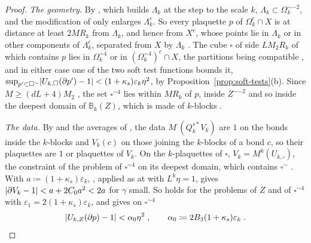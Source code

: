 \documentclass[11pt]{preprint}
\DeclarePairedDelimiter{\abs}{\lvert}{\rvert}
\numberwithin{equation}{section}
\theoremstyle{definition}
\theoremstyle{remark}
\theoremstyle{plain}
\begin{document}
\begin{proof}
\emph{The geometry.} By \cite[(3.20), p.~269]{BalabanCRE}, which builds $\Lambda_k$ at the step to the scale $k$, $\Lambda_k \subset \Omega_k^{\sim-2}$, and the modification of \cite[p.~269]{BalabanCRE} only enlarges $\Lambda_k^c$. So every plaquette $p$ of $\Omega_k^c \cap X$ is at distance at least $2MR_k$ from $\Lambda_k$, and hence from $X^c$, whose points lie in $\Lambda_k$ or in other components of $\Lambda_k^c$, separated from $X$ by $\Lambda_k$ \cite[p.~264]{BalabanCRE}. The cube $\square$ of side $LM_2R_k$ of \cite[(2.17)]{BalabanCRE} which contains $p$ lies in $\Omega_k^{\sim4}$ or in $(\Omega_k^{\sim4})^c \cap X$, the partitions being compatible \cite[p.~245]{BalabanCRE}, and in either case one of the two soft test functions bounds it, $\sup_{p' \subset \square^\sim}\abs{U_{k,\square}(\partial p') - 1} < (1 + \kappa_s)\varepsilon_k\eta^2$, by Proposition~\ref{prop:soft-tests}(b). Since $M \geq (dL + 4)M_2$ \cite[p.~245]{BalabanCRE}, the set $\square^{\sim4}$ lies within $MR_k$ of $p$, inside $Z^{\sim-2}$ and so inside the deepest domain of $\mathbb B_k(Z)$, which is made of $k$-blocks \cite[p.~256]{BalabanCRE}.

\emph{The data.} By \cite[(1.3)]{BalabanCRE} and the averages of \cite[(0.4), p.~253]{BalabanRG1}, the data $M^\cdot(Q_k^{s*}V_k)$ are $1$ on the bonds inside the $k$-blocks and $V_k(c)$ on those joining the $k$-blocks of a bond $c$, so their plaquettes are $1$ or plaquettes of $V_k$. On the $k$-plaquettes of $\square$, $V_k = M^k(U_{k,\square})$, the constraint of the problem of $\square^{\sim4}$ on its deepest domain, which contains $\square^\sim$ \cite[p.~256]{BalabanCRE}. With $a \coloneqq (1 + \kappa_s)\varepsilon_k$, \cite[Proposition~2]{BalabanAVG}, applied as at \cite[p.~87, l.~35]{BalabanREG} with $L^k\eta = 1$, gives $\abs{\partial V_k - 1} < a + 2C_0a^2 < 2a$ for $\gamma$ small. So \cite[(7)]{BalabanVAR} holds for the problems of $Z$ and of $\square^{\sim4}$ with $\varepsilon_1 = 2(1 + \kappa_s)\varepsilon_k$, and \cite[Theorem~1, (8), p.~279]{BalabanVAR} gives on $\square^{\sim4}$
\begin{equation}\label{eq:first-class-alpha}
    \abs{U_{k,Z}(\partial p) - 1} < \alpha_0\eta^2\;,
    \qquad
    \alpha_0 \coloneqq 2B_3(1 + \kappa_s)\varepsilon_k\;.
\end{equation}


\end{proof}
\end{document}
